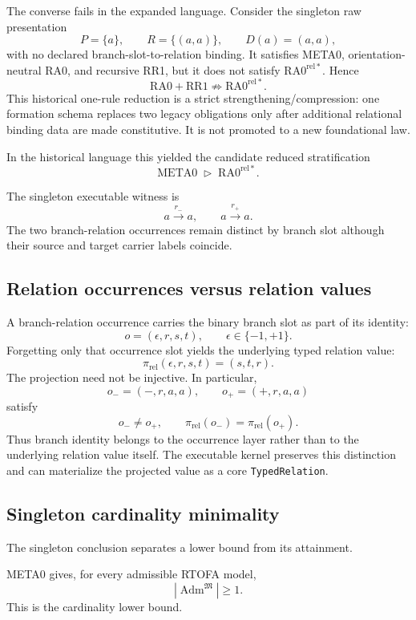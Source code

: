 \documentclass[11pt]{article}
\begin{document}
The converse fails in the expanded language. Consider the singleton raw
presentation
\[
P=\{a\},
\qquad
R=\{(a,a)\},
\qquad
D(a)=(a,a),
\]
with no declared branch-slot-to-relation binding. It satisfies META0,
orientation-neutral RA0, and recursive RR1, but it does not satisfy
\(\mathrm{RA0}^{\mathrm{rel}*}\). Hence
\[
\boxed{
\mathrm{RA0}+\mathrm{RR1}
\not\Rightarrow
\mathrm{RA0}^{\mathrm{rel}*}.
}
\]
This historical one-rule reduction is a strict strengthening/compression:
one formation schema replaces two legacy obligations only after additional
relational binding data are made constitutive. It is not promoted to a new
foundational law.

In the historical language this yielded the candidate reduced stratification
\[
\boxed{
\mathrm{META0}
\;\triangleright\;
\mathrm{RA0}^{\mathrm{rel}*}.
}
\]

The singleton executable witness is
\[
a\xrightarrow{r_-}a,
\qquad
a\xrightarrow{r_+}a.
\]
The two branch-relation occurrences remain distinct by branch slot although
their source and target carrier labels coincide.

\subsection{Relation occurrences versus relation values}

A branch-relation occurrence carries the binary branch slot as part of its
identity:
\[
o=(\epsilon,r,s,t),
\qquad
\epsilon\in\{-1,+1\}.
\]
Forgetting only that occurrence slot yields the underlying typed relation
value:
\[
\boxed{
\pi_{\mathrm{rel}}(\epsilon,r,s,t)
=
(s,t,r).
}
\]
The projection need not be injective. In particular,
\[
o_-=(-,r,a,a),
\qquad
o_+=(+,r,a,a)
\]
satisfy
\[
o_-\neq o_+,
\qquad
\pi_{\mathrm{rel}}(o_-)
=
\pi_{\mathrm{rel}}(o_+).
\]
Thus branch identity belongs to the occurrence layer rather than to the
underlying relation value itself. The executable kernel preserves this
distinction and can materialize the projected value as a core
\texttt{TypedRelation}.

\subsection{Singleton cardinality minimality}

The singleton conclusion separates a lower bound from its attainment.

META0 gives, for every admissible RTOFA model,
\[
\boxed{
|\operatorname{Adm}^{\mathfrak M}|\ge1.
}
\]
This is the cardinality lower bound.
\end{document}
